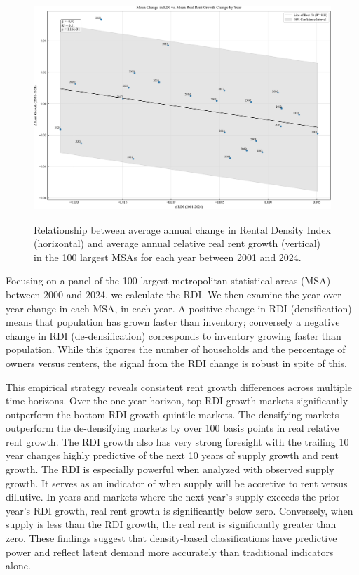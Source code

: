\documentclass[APA,Times1COL]{WileyNJDv5} %
\begin{document}
\begin{figure}[htb!]
	\centerline{\includegraphics[height=20pc]{rdi_rent_growth_2024.pdf}}
	\caption{Relationship between average annual change in Rental Density Index (horizontal) and average annual relative real rent growth (vertical) in the 100 largest MSAs for each year between 2001 and 2024. \label{fig:rdi_national}}
\end{figure}

Focusing on a panel of the 100 largest metropolitan statistical areas (MSA) between 2000 and 2024, we calculate the RDI. We then examine the year-over-year change in each MSA, in each year. A positive change in RDI (densification) means that population has grown faster than inventory; conversely a negative change in RDI (de-densification) corresponds to inventory growing faster than population. While this ignores the number of households and the percentage of owners versus renters, the signal from the RDI change is robust in spite of this.

This empirical strategy reveals consistent rent growth differences across multiple time horizons. Over the one-year horizon, top RDI growth  markets significantly outperform the bottom RDI growth quintile markets. The densifying markets outperform the de-densifying markets by over 100 basis points in real relative rent growth. The RDI growth also has very strong foresight with the trailing 10 year changes highly predictive of the next 10 years of supply growth and rent growth. The RDI is especially powerful when analyzed with observed supply growth. It serves as an indicator of when supply will be accretive to rent versus dillutive. In years and markets where the next year's supply exceeds the prior year's RDI growth, real rent growth is significantly below zero. Conversely, when supply is less than the RDI growth, the real rent is significantly greater than zero. These findings suggest that density-based classifications have predictive power and reflect latent demand more accurately than traditional indicators alone.
\end{document}
